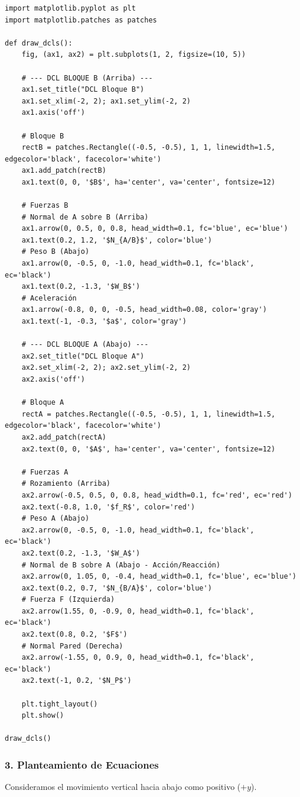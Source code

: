 \documentclass[12pt, a4paper]{article}
\begin{document}
\begin{lstlisting}
import matplotlib.pyplot as plt
import matplotlib.patches as patches

def draw_dcls():
    fig, (ax1, ax2) = plt.subplots(1, 2, figsize=(10, 5))
    
    # --- DCL BLOQUE B (Arriba) ---
    ax1.set_title("DCL Bloque B")
    ax1.set_xlim(-2, 2); ax1.set_ylim(-2, 2)
    ax1.axis('off')
    
    # Bloque B
    rectB = patches.Rectangle((-0.5, -0.5), 1, 1, linewidth=1.5, edgecolor='black', facecolor='white')
    ax1.add_patch(rectB)
    ax1.text(0, 0, '$B$', ha='center', va='center', fontsize=12)
    
    # Fuerzas B
    # Normal de A sobre B (Arriba)
    ax1.arrow(0, 0.5, 0, 0.8, head_width=0.1, fc='blue', ec='blue')
    ax1.text(0.2, 1.2, '$N_{A/B}$', color='blue')
    # Peso B (Abajo)
    ax1.arrow(0, -0.5, 0, -1.0, head_width=0.1, fc='black', ec='black')
    ax1.text(0.2, -1.3, '$W_B$')
    # Aceleración
    ax1.arrow(-0.8, 0, 0, -0.5, head_width=0.08, color='gray')
    ax1.text(-1, -0.3, '$a$', color='gray')

    # --- DCL BLOQUE A (Abajo) ---
    ax2.set_title("DCL Bloque A")
    ax2.set_xlim(-2, 2); ax2.set_ylim(-2, 2)
    ax2.axis('off')
    
    # Bloque A
    rectA = patches.Rectangle((-0.5, -0.5), 1, 1, linewidth=1.5, edgecolor='black', facecolor='white')
    ax2.add_patch(rectA)
    ax2.text(0, 0, '$A$', ha='center', va='center', fontsize=12)
    
    # Fuerzas A
    # Rozamiento (Arriba)
    ax2.arrow(-0.5, 0.5, 0, 0.8, head_width=0.1, fc='red', ec='red')
    ax2.text(-0.8, 1.0, '$f_R$', color='red')
    # Peso A (Abajo)
    ax2.arrow(0, -0.5, 0, -1.0, head_width=0.1, fc='black', ec='black')
    ax2.text(0.2, -1.3, '$W_A$')
    # Normal de B sobre A (Abajo - Acción/Reacción)
    ax2.arrow(0, 1.05, 0, -0.4, head_width=0.1, fc='blue', ec='blue')
    ax2.text(0.2, 0.7, '$N_{B/A}$', color='blue')
    # Fuerza F (Izquierda)
    ax2.arrow(1.55, 0, -0.9, 0, head_width=0.1, fc='black', ec='black')
    ax2.text(0.8, 0.2, '$F$')
    # Normal Pared (Derecha)
    ax2.arrow(-1.55, 0, 0.9, 0, head_width=0.1, fc='black', ec='black')
    ax2.text(-1, 0.2, '$N_P$')

    plt.tight_layout()
    plt.show()

draw_dcls()
\end{lstlisting}

\subsubsection*{3. Planteamiento de Ecuaciones}
Consideramos el movimiento vertical hacia abajo como positivo ($+y$).
\end{document}
